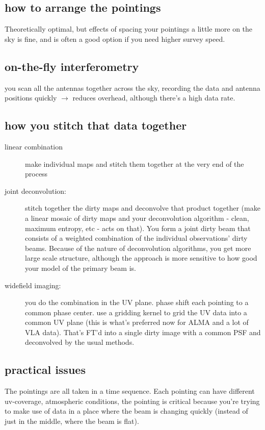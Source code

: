 \documentclass[a4paper]{article}
\begin{document}
\subsection{how to arrange the pointings}

Theoretically optimal, but effects of spacing your pointings a little more on the sky is fine, and is often a good option if you need higher survey speed. 

\subsection{on-the-fly interferometry}

you scan all the antennas together across the sky, recording the data and antenna positions quickly $\rightarrow$ reduces overhead, although there's a high data rate. 

\subsection{how you stitch that data together}

\begin{description}
\item[linear combination] make individual maps and stitch them together at the very end of the process
\item[joint deconvolution:] stitch together the dirty maps and deconvolve that product together (make a linear mosaic of dirty maps and your deconvolution algorithm - clean, maximum entropy, etc - acts on that). You form a joint dirty beam that consists of a weighted combination of the individual observations' dirty beams. Because of the nature of deconvolution algorithms, you get more large scale structure, although the approach is more sensitive to how good your model of the primary beam is. 
\item[widefield imaging:] you do the combination in the UV plane. phase shift each pointing to a common phase center. use a gridding kernel to grid the UV data into a common UV plane (this is what's preferred now for ALMA and a lot of VLA data). That's FT'd into a single dirty image with a common PSF and deconvolved by the usual methods. 
\end{description}

\subsection{practical issues}

The pointings are all taken in a time sequence. Each pointing can have different uv-coverage, atmospheric conditions, the pointing is critical because you're trying to make use of data in a place where the beam is changing quickly (instead of just in the middle, where the beam is flat). 
\end{document}
